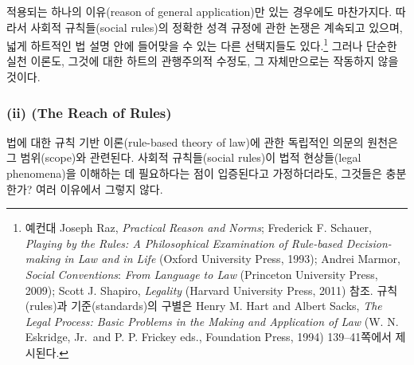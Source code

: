 적용되는 하나의 이유(reason of general application)만 있는 경우에도
마찬가지다. 따라서 사회적 규칙들(social rules)의 정확한 성격 규정에 관한
논쟁은 계속되고 있으며, 넓게 하트적인 법 설명 안에 들어맞을 수 있는 다른
선택지들도 있다.\footnote{예컨대 Joseph Raz, \emph{Practical Reason and
  Norms}; Frederick F. Schauer, \emph{Playing by the Rules: A
  Philosophical Examination of Rule-based Decision-making in Law and in
  Life} (Oxford University Press, 1993); Andrei Marmor, \emph{Social
  Conventions}: \emph{From Language to Law} (Princeton University Press,
  2009); Scott J. Shapiro, \emph{Legality} (Harvard University Press,
  2011) 참조. 규칙(rules)과 기준(standards)의 구별은 Henry M. Hart and
  Albert Sacks, \emph{The Legal Process: Basic Problems in the Making
  and Application of Law} (W. N. Eskridge, Jr.~and P. P. Frickey eds.,
  Foundation Press, 1994) 139--41쪽에서 제시된다.} 그러나 단순한 실천
이론도, 그것에 대한 하트의 관행주의적 수정도, 그 자체만으로는 작동하지
않을 것이다.

\subsubsection{\texorpdfstring{(ii)  (The Reach
of
Rules)}{(ii) 규칙들의 도달 범위 (The Reach of Rules)}}\label{ii-uxaddcuxce59uxb4e4uxc758-uxb3c4uxb2ec-uxbc94uxc704-the-reach-of-rules}

법에 대한 규칙 기반 이론(rule-based theory of law)에 관한 독립적인
의문의 원천은 그 범위(scope)와 관련된다. 사회적 규칙들(social rules)이
법적 현상들(legal phenomena)을 이해하는 데 필요하다는 점이 입증된다고
가정하더라도, 그것들은 충분한가? 여러 이유에서 그렇지 않다.

